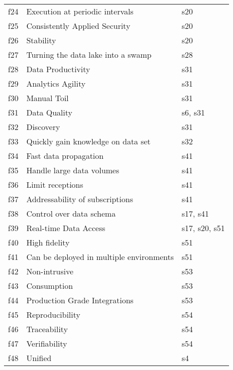 \begin{tabular}{|c|p{}|p{}|}
f24 & Execution at periodic intervals & \cellcolor{emerald_shape_1} {s20}\\
f25 & Consistently Applied Security & \cellcolor{emerald_shape_1} {s20}\\
f26 & Stability & \cellcolor{emerald_shape_1} {s20}\\
f27 & Turning the data lake into a swamp & \cellcolor{emerald_shape_1} {s28}\\
f28 & Data Productivity & \cellcolor{emerald_shape_1} {s31}\\
f29 & Analytics Agility & \cellcolor{emerald_shape_1} {s31}\\
f30 & Manual Toil & \cellcolor{emerald_shape_1} {s31}\\
f31 & Data Quality & \cellcolor{emerald_shape_1} {s6, s31}\\
f32 & Discovery & \cellcolor{emerald_shape_1} {s31}\\
f33 & Quickly gain knowledge on data set & \cellcolor{emerald_shape_1} {s32}\\
f34 & Fast data propagation & \cellcolor{emerald_shape_1} {s41}\\
f35 & Handle large data volumes & \cellcolor{emerald_shape_1} {s41}\\
f36 & Limit receptions & \cellcolor{emerald_shape_1} {s41}\\
f37 & Addressability of subscriptions & \cellcolor{emerald_shape_1} {s41}\\
f38 & Control over data schema & \cellcolor{emerald_shape_1} {s17, s41}\\
f39 & Real-time Data Access & \cellcolor{emerald_shape_2} {s17, s20, s51}\\
f40 & High fidelity & \cellcolor{emerald_shape_1} {s51}\\
f41 & Can be deployed in multiple environments & \cellcolor{emerald_shape_1} {s51}\\
f42 & Non-intrusive & \cellcolor{emerald_shape_1} {s53}\\
f43 & Consumption & \cellcolor{emerald_shape_1} {s53}\\
f44 & Production Grade Integrations & \cellcolor{emerald_shape_1} {s53}\\
f45 & Reproducibility & \cellcolor{emerald_shape_1} {s54}\\
f46 & Traceability & \cellcolor{emerald_shape_1} {s54}\\
f47 & Verifiability & \cellcolor{emerald_shape_1} {s54}\\
f48 & Unified & \cellcolor{emerald_shape_1} {s4}\\

\end{tabular}
